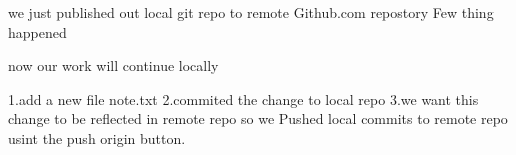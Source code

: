 we just published out local git repo
to remote Github.com repostory
Few thing happened 



now our work will continue locally

1.add a new file note.txt
2.commited the change to local repo
3.we want this change to be reflected in remote
repo so we Pushed local commits to remote repo usint the push origin button.